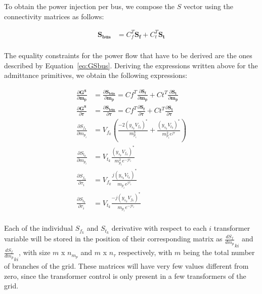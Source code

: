 To obtain the power injection per bus, we compose the $S$ vector using the connectivity matrices as follows:


\begin{equation}
\begin{split}
    \bm{S_{bus}} &= C_f^T \bm{S_f} + C_t^T \bm{S_t}\\
\end{split}
\end{equation}

The equality constraints for the power flow that have to be derived are the ones described by Equation~\eqref{eq:GSbus}. Deriving the expressions written above for the admittance primitives, we obtain the following expressions:


\begin{equation}
\begin{split}
    \frac{\partial \bm{G^S}}{\partial \bm{m_p}} &= \frac{\partial \bm{S_{bus}}}{\partial \bm{m_p}} = Cf^T \frac{\partial \bm{S_f}}{\partial \bm{m_p}} + Ct^T \frac{\partial \bm{S_t}}{\partial \bm{m_p}}\\
    \frac{\partial \bm{G^S}}{\partial \bm{\tau}} &= \frac{\partial \bm{S_{bus}}}{\partial \bm{\tau}} = Cf^T \frac{\partial \bm{S_f}}{\partial \bm{\tau}} + Ct^T \frac{\partial \bm{S_t}}{\partial \bm{\tau}}\\
    \frac{\partial S_{f_k}}{\partial m_{p_i}} &= V_{f_k} (\frac{-2(y_{s_k}V_{f_k})^*}{m_{p_i}^3} + \frac{(y_{s_k}V_{t_k})^*}{m_{p_i}^2 e^{j\tau}})  \\
    \frac{\partial S_{t_k}}{\partial m_{p_i}} &= V_{t_k} \frac{(y_{s_k}V_{f_k})^*}{m_{p_i}^2 e^{-j\tau_i}} \\
    \frac{\partial S_{f_k}}{\partial \tau_i} &= V_{f_k} \frac{j(y_{s_k}V_{t_k})^*}{m_{p_i} e^{j\tau_i}}\\
    \frac{\partial S_{t_k}}{\partial \tau_i} &= V_{t_k} \frac{-j(y_{s_k}V_{f_k})^*}{m_{p_i} e^{-j\tau_i}}\\
\end{split}
\label{eq:Gmptau}
\end{equation}

Each of the individual $S_{f_k}$ and $S_{t_k}$ derivative with respect to each $i$ transformer variable will be stored in the position of their corresponding matrix as $\frac{dS_f}{dm_p}_{ki}$ and $\frac{dS_f}{dm_p}_{ki}$, 
with size $m$ x $n_{m_p}$ and  $m$ x $n_{\tau}$ respectively, with $m$ being the total number of branches of the grid. These matrices will have very few values different from zero, since the transformer control is only present in a few transformers of the grid.

